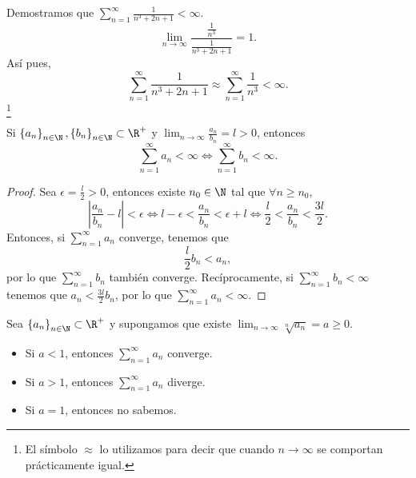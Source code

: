 \begin{eg}
\normalfont Demostramos que $\displaystyle \sum^{\infty}_{n = 1}\frac{1}{n^{3}+2n+1} < \infty $.
\[\lim_{n \to \infty}\frac{\frac{1}{n^{3}}}{\frac{1}{n^{3}+2n+1}} = 1 .\]
Así pues, 
\[\sum^{\infty}_{n = 1}\frac{1}{n^{3}+2n+1} \approx \sum^{\infty}_{n = 1}\frac{1}{n^{3}} < \infty .\]
\footnote{El símbolo $\displaystyle \approx $ lo utilizamos para decir que cuando $\displaystyle n \to \infty $ se comportan prácticamente igual.} 
\end{eg}

\begin{ftheorem}[]
	\normalfont Si $\displaystyle \left\{ a_{n}\right\} _{n\in\N}, \left\{ b_{n}\right\} _{n\in\N}\subset\R^{+} $ y $\displaystyle \lim_{n \to \infty}\frac{a_{n}}{b_{n}} = l > 0 $, entonces
	\[\sum^{\infty}_{n = 1}a_{n} < \infty \iff \sum^{\infty}_{n = 1}b_{n} < \infty .\]
\end{ftheorem}

\begin{proof}
Sea $\displaystyle \epsilon = \frac{l}{2} > 0 $, entonces existe $\displaystyle n_{0} \in \N $ tal que $\displaystyle \forall n \geq n_{0} $, 
\[ \left|\frac{a_{n}}{b_{n}}-l\right|<\epsilon \iff l- \epsilon < \frac{a_{n}}{b_{n}} < \epsilon + l \iff \frac{l}{2}< \frac{a_{n}}{b_{n}} < \frac{3l}{2} .\]
Entonces, si $\displaystyle \sum^{\infty}_{n =1}a_{n} $ converge, tenemos que 
\[\frac{l}{2}b_{n} < a_{n} ,\]
por lo que $\displaystyle \sum^{\infty}_{n = 1}b_{n} $ también converge. Recíprocamente, si $\displaystyle \sum^{\infty}_{n = 1}b_{n} < \infty $ tenemos que $\displaystyle a_{n} < \frac{3l}{2}b_{n} $, por lo que $\displaystyle \sum^{\infty}_{n = 1}a_{n} < \infty $.
\end{proof}

\begin{ftheorem}
	\normalfont Sea $\displaystyle \left\{ a_{n}\right\} _{n\in\N}\subset\R^{+} $ y supongamos que existe $\displaystyle \lim_{n \to \infty}\sqrt[n]{a_{n}} = a \geq 0 $.
\begin{itemize}
\item Si $\displaystyle a < 1 $, entonces $\displaystyle \sum^{\infty}_{n =1}a_{n} $ converge.
\item Si $\displaystyle a > 1 $, entonces $\displaystyle \sum^{\infty}_{n = 1}a_{n} $ diverge.
\item Si $\displaystyle a = 1 $, entonces no sabemos.
\end{itemize}
\end{ftheorem}

